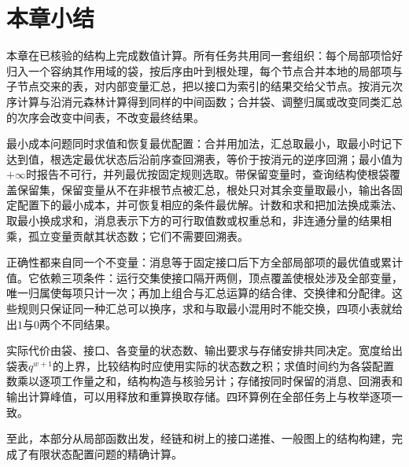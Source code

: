 \FloatBarrier
\section{本章小结}
\label{sec:dp-computation-chapter-summary}

本章在已核验的结构上完成数值计算。所有任务共用同一套组织：每个局部项恰好归入一个容纳其作用域的袋，按后序由叶到根处理，每个节点合并本地的局部项与子节点交来的表，对内部变量汇总，把以接口为索引的结果交给父节点。按消元次序计算与沿消元森林计算得到同样的中间函数；合并袋、调整归属或改变同类汇总的次序会改变中间表，不改变最终结果。

最小成本问题同时求值和恢复最优配置：合并用加法，汇总取最小，取最小时记下达到值，根选定最优状态后沿前序查回溯表，等价于按消元的逆序回溯；最小值为$+\infty$时报告不可行，并列最优按固定规则选取。带保留变量时，查询结构使根袋覆盖保留集，保留变量从不在非根节点被汇总，根处只对其余变量取最小，输出各固定配置下的最小成本，并可恢复相应的条件最优解。计数和求和把加法换成乘法、取最小换成求和，消息表示下方的可行取值数或权重总和，非连通分量的结果相乘，孤立变量贡献其状态数；它们不需要回溯表。

正确性都来自同一个不变量：消息等于固定接口后下方全部局部项的最优值或累计值。它依赖三项条件：运行交集使接口隔开两侧，顶点覆盖使根处涉及全部变量，唯一归属使每项只计一次；再加上组合与汇总运算的结合律、交换律和分配律。这些规则只保证同一种汇总可以换序，求和与取最小混用时不能交换，四项小表就给出$1$与$0$两个不同结果。

实际代价由袋、接口、各变量的状态数、输出要求与存储安排共同决定。宽度给出袋表$q^{w+1}$的上界，比较结构时应使用实际的状态数之积；求值时间约为各袋配置数乘以逐项工作量之和，结构构造与核验另计；存储按同时保留的消息、回溯表和输出计算峰值，可以用释放和重算换取存储。四环算例在全部任务上与枚举逐项一致。

至此，本部分从局部函数出发，经链和树上的接口递推、一般图上的结构构建，完成了有限状态配置问题的精确计算。
